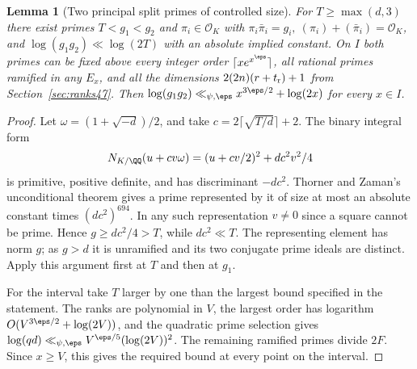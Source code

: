 \documentclass[a4paper,11pt]{article}
\newtheorem{lemma}[proposition]{Lemma}
\theoremstyle{definition}
\theoremstyle{remark}
\numberwithin{equation}{section}
\newcommand{\OO}{\mathcal O}
\begin{document}
\begin{lemma}[Two principal split primes of controlled size]\label{lem:aux49}
For \(T\ge\max(d,3)\) there exist primes \(T<g_1<g_2\)
and \(\pi_i\in\OO_K\) with
\(\pi_i\bar\pi_i=g_i,\ (\pi_i)+(\bar\pi_i)=\OO_K\), and
\(\log(g_1g_2)\ll\log(2T)\) with an absolute implied constant.
On \(I\) both primes can be fixed above every integer order
\(\lceil x e^{x^\eps}\rceil\), all rational primes ramified in any
\(E_x\), and all the dimensions \(2(2n)(r+t_{\rm r})+1\) from
Section~\ref{sec:ranks47}. Then
\(\log(g_1g_2)\ll_{\psi,\eps}x^{3\eps/2}+\log(2x)\) for every \(x\in I\).
\end{lemma}
\begin{proof}
Let \(\omega=(1+\sqrt{-d})/2\), and take
\(c=2\lceil\sqrt{T/d}\rceil+2\). The binary integral form
\[
 N_{K/\QQ}(u+cv\omega)=(u+cv/2)^2+dc^2v^2/4
\]
is primitive, positive definite, and has discriminant \(-dc^2\).
Thorner and Zaman's unconditional theorem gives a prime represented
by it of size at most an absolute constant times \((dc^2)^{694}\).
In any such representation \(v\ne0\) since a square cannot be prime.
Hence \(g\ge dc^2/4>T\), while \(dc^2\ll T\).
The representing element has norm \(g\); as \(g>d\) it is unramified
and its two conjugate prime ideals are distinct. Apply this argument
first at \(T\) and then at \(g_1\).~\cite[Thm.~1.2]{XIII-X-IV-tz49}

For the interval take \(T\) larger by one than the largest bound
specified in the statement. The ranks are polynomial in \(V\), the
largest order has logarithm \(O(V^{3\eps/2}+\log(2V))\), and the
quadratic prime selection gives
\(\log(qd)\ll_{\psi,\eps} V^{\eps/5}(\log(2V))^2\).
The remaining ramified primes divide \(2F\). Since \(x\ge V\), this
gives the required bound at every point on the interval.
\end{proof}
\end{document}
